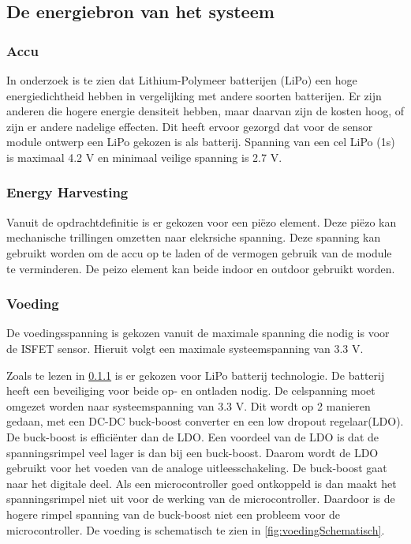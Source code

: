 \subsection{De energiebron van het systeem} \label{sec:energy}

\subsubsection{Accu} \label{sec:batterijOntwerp}
In onderzoek \cite{BatteryComparison} is te zien dat Lithium-Polymeer batterijen (LiPo) een hoge energiedichtheid hebben in vergelijking met andere soorten batterijen. Er zijn anderen die hogere energie densiteit hebben, maar daarvan zijn de kosten hoog, of zijn er andere nadelige effecten\cite{BatteryComparison}. Dit heeft ervoor gezorgd dat voor de sensor module ontwerp een LiPo gekozen is als batterij. Spanning van een cel LiPo (1s) is maximaal 4.2 V en minimaal veilige spanning is 2.7 V\cite{BatteryComparison}.

\subsubsection{Energy Harvesting}

Vanuit de opdrachtdefinitie is er gekozen voor een piëzo element. Deze piëzo kan mechanische trillingen omzetten naar elekrsiche spanning. Deze spanning kan gebruikt worden om de accu op te laden of de vermogen gebruik van de module te verminderen. De peizo element kan beide indoor en outdoor gebruikt worden.


\subsubsection{Voeding} \label{sec:voeding}


De voedingsspanning is gekozen vanuit de maximale spanning die nodig is voor de ISFET sensor\cite{isfet}. Hieruit volgt een maximale systeemspanning van 3.3 V.


Zoals te lezen in \cref{sec:batterijOntwerp} is er gekozen voor LiPo batterij technologie. De batterij heeft een beveiliging voor beide op- en ontladen nodig. De celspanning moet omgezet worden naar systeemspanning van 3.3 V. Dit wordt op 2 manieren gedaan, met een DC-DC buck-boost converter en een low dropout regelaar(LDO). De buck-boost is efficiënter dan de LDO. Een voordeel van de LDO is dat de spanningsrimpel veel lager is dan bij een buck-boost. Daarom wordt de LDO gebruikt voor het voeden van de analoge uitleesschakeling. De buck-boost gaat naar het digitale deel. Als een microcontroller goed ontkoppeld is dan maakt het spanningsrimpel niet uit voor de werking van de microcontroller. Daardoor is de hogere rimpel spanning van de buck-boost niet een probleem voor de microcontroller. De voeding is schematisch te zien in \cref{fig:voedingSchematisch}.

